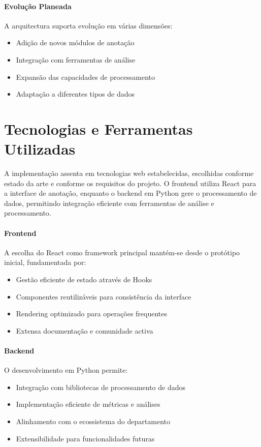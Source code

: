 \paragraph{Evolução Planeada}
A arquitectura suporta evolução em várias dimensões:

\begin{itemize}
    \item Adição de novos módulos de anotação
    \item Integração com ferramentas de análise
    \item Expansão das capacidades de processamento
    \item Adaptação a diferentes tipos de dados
\end{itemize}

\section{Tecnologias e Ferramentas Utilizadas}

A implementação assenta em tecnologias web estabelecidas, escolhidas conforme estado da arte e conforme os requisitos do projeto. O frontend utiliza React para a interface de anotação, enquanto o backend em Python gere o processamento de dados, permitindo integração eficiente com ferramentas de análise e processamento.

\paragraph{Frontend}
A escolha do React como framework principal mantém-se desde o protótipo inicial, fundamentada por:

\begin{itemize}
    \item Gestão eficiente de estado através de Hooks
    \item Componentes reutilizáveis para consistência da interface
    \item Rendering optimizado para operações frequentes
    \item Extensa documentação e comunidade activa
\end{itemize}

\paragraph{Backend}
O desenvolvimento em Python permite:

\begin{itemize}
    \item Integração com bibliotecas de processamento de dados
    \item Implementação eficiente de métricas e análises
    \item Alinhamento com o ecossistema do departamento
    \item Extensibilidade para funcionalidades futuras
\end{itemize}

